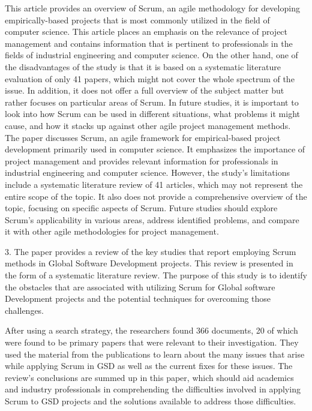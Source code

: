 \documentclass[conference]{IEEEtran}
\begin{document}
\begin{enumerate}
This article provides an overview of Scrum, an agile methodology for developing empirically-based projects that is most commonly utilized in the field of computer science. This article places an emphasis on the relevance of project management and contains information that is pertinent to professionals in the fields of industrial engineering and computer science. On the other hand, one of the disadvantages of the study is that it is based on a systematic literature evaluation of only 41 papers, which might not cover the whole spectrum of the issue. In addition, it does not offer a full overview of the subject matter but rather focuses on particular areas of Scrum. In future studies, it is important to look into how Scrum can be used in different situations, what problems it might cause, and how it stacks up against other agile project management methods. The paper discusses Scrum, an agile framework for empirical-based project development primarily used in computer science. It emphasizes the importance of project management and provides relevant information for professionals in industrial engineering and computer science. However, the study's limitations include a systematic literature review of 41 articles, which may not represent the entire scope of the topic. It also does not provide a comprehensive overview of the topic, focusing on specific aspects of Scrum. Future studies should explore Scrum's applicability in various areas, address identified problems, and compare it with other agile methodologies for project management.
\newline
\end{enumerate}

3. The paper \cite{scrump3} provides a review of the key studies that report employing Scrum methods in Global Software Development projects. This review is presented in the form of a systematic literature review. The purpose of this study is to identify the obstacles that are associated with utilizing Scrum for Global software Development  projects and the potential techniques for overcoming those challenges.

After using a search strategy, the researchers found 366 documents, 20 of which were found to be primary papers that were relevant to their investigation. They used the material from the publications to learn about the many issues that arise while applying Scrum in GSD as well as the current fixes for these issues. The review's conclusions are summed up in this paper, which should aid academics and industry professionals in comprehending the difficulties involved in applying Scrum to GSD projects and the solutions available to address those difficulties.
\end{document}
